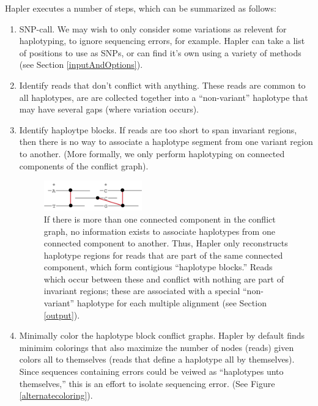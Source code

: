 \documentclass[11pt]{llncs}
\begin{document}
Hapler executes a number of steps, which can be summarized as follows:
\begin{enumerate}
	
	\item SNP-call. We may wish to only consider some variations as relevent for haplotyping, to ignore sequencing errors, for example. Hapler can 
	take a list of positions to use as SNPs, or can find it's own using a variety of methods (see Section \ref{inputAndOptions}).
	
	\item Identify reads that don't conflict with anything. These reads are common to all haplotypes, are are collected together into a ``non-variant''
	haplotype that may have several gaps (where variation occurs).
	
	\item Identify haploytpe blocks. If reads are too short to span invariant regions, then there is no way to associate a haplotype segment from
	one variant region to another. (More formally, we only perform haplotyping on connected components of the conflict graph).

\begin{figure}[!h]
\centering
   \includegraphics[width=0.4\textwidth]{graphics/haplotype_blocks}
   \caption{If there is more than one connected component in the conflict graph, no information exists to associate haplotypes from
   one connected component to another. Thus, Hapler only reconstructs haplotype regions for reads that are part of the same connected 
   component, which form contigious ``haplotype blocks.'' Reads which occur between these and conflict with nothing are part of invariant
   regions; these are associated with a special ``non-variant'' haplotype for each multiple alignment (see Section \ref{output}).}
   \label{bicolor}
\end{figure}

	
	\item Minimally color the haplotype block conflict graphs. Hapler by default finds minimim colorings that also maximize the number of nodes 
	(reads) given colors all to themselves (reads that define a haplotype all by themselves). Since sequences containing errors could be veiwed as 
	``haplotypes unto themselves,'' this is an effort to isolate sequencing error. (See Figure \ref{alternatecoloring}).	
	

\end{enumerate}
\end{document}
